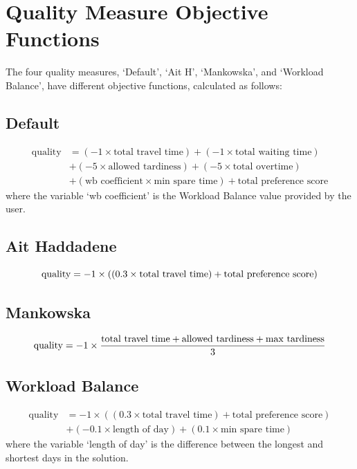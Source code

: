 \documentclass[a4paper]{article}
\begin{document}
\section{Quality Measure Objective Functions}
The four quality measures, `Default', `Ait H', `Mankowska', and `Workload Balance', have different objective functions, calculated as follows:
\subsection{Default}
\begin{equation}
	\begin{split}
		\text{quality} &= (-1\times \text{total travel time}) + (-1 \times \text{total waiting time}) \\
		&+ (-5 \times \text{allowed tardiness}) + (-5 \times \text{total overtime}) \\
		&+ (\text{wb coefficient} \times \text{min spare time}) + \text{total preference score}
	\end{split}
\end{equation}
\noindent where the variable `wb coefficient' is the Workload Balance value provided by the user.

\subsection{Ait Haddadene}
\begin{equation}
	\text{quality} = -1\times ((0.3 \times \text{total travel time}) + \text{total preference score}) \\
\end{equation}

\subsection{Mankowska}
\begin{equation}
	\text{quality} = -1\times \frac{\text{total travel time} + \text{allowed tardiness} + \text{max tardiness}}{3} \\
\end{equation}

\subsection{Workload Balance}
\begin{equation}
	\begin{split}
		\text{quality} &= -1 \times ((0.3 \times \text{total travel time}) + \text{total preference score}) \\
		& + (-0.1 \times \text{length of day}) + (0.1 \times \text{min spare time})
	\end{split}
\end{equation}
\noindent where the variable `length of day' is the difference between the longest and shortest days in the solution.
\end{document}

